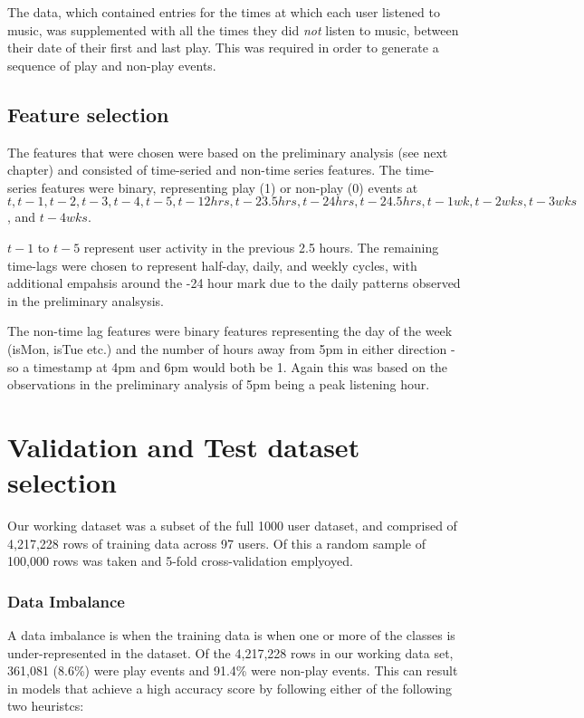 The data, which contained entries for the times at which each user listened to music, was supplemented with all the times they did \emph{not} listen to music, between their date of their first and last play.  This was required in order to generate a sequence of play and non-play events. 

\subsection{Feature selection}

The features that were chosen were based on the preliminary analysis (see next chapter) and consisted of time-seried and non-time series features. The time-series features were binary, representing play (1) or non-play (0) events at $t, t-1, t-2, t-3, t-4, t-5,  t-12hrs, t-23.5hrs, t-24hrs, t-24.5hrs, t-1wk, t-2wks, t-3wks$, and $t-4wks$.

$t-1$ to $t-5$ represent user activity in the previous 2.5 hours. The remaining time-lags were chosen to represent half-day, daily, and weekly cycles, with additional empahsis around the -24 hour mark due to the daily patterns observed in the preliminary analsysis.  

The non-time lag features were binary features representing the day of the week (isMon, isTue etc.) and the number of hours away from 5pm in either direction - so a timestamp at 4pm and 6pm would both be 1. Again this was based on the observations in the preliminary analysis of 5pm being a peak listening hour.

\section{Validation and Test dataset selection}

Our working dataset was a subset of the full 1000 user dataset, and comprised of 4,217,228 rows of training data across 97 users. Of this a random sample of 100,000 rows was taken and 5-fold cross-validation emplyoyed.  

\subsubsection{Data Imbalance}

A data imbalance is when the training data is when one or more of the classes is under-represented in the dataset. Of the 4,217,228 rows in our working data set, 361,081 (8.6\%) were play events and 91.4\% were non-play events. This can result in models that achieve a high accuracy score by following either of the following two heuristcs:


